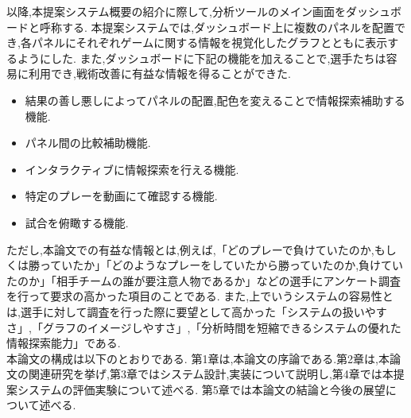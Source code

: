 \documentclass[sotsuron]{kuee}
\begin{document}
	以降,本提案システム概要の紹介に際して,分析ツールのメイン画面をダッシュボードと呼称する.
	本提案システムでは,ダッシュボード上に複数のパネルを配置でき,各パネルにそれぞれゲームに関する情報を視覚化したグラフとともに表示するようにした.
	また,ダッシュボードに下記の機能を加えることで,選手たちは容易に利用でき,戦術改善に有益な情報を得ることができた.
		\begin{itemize}
			\item 結果の善し悪しによってパネルの配置,配色を変えることで情報探索補助する機能.
			\item パネル間の比較補助機能.
			\item インタラクティブに情報探索を行える機能.
			\item 特定のプレーを動画にて確認する機能.
			\item 試合を俯瞰する機能.
		\end{itemize}
	ただし,本論文での有益な情報とは,例えば,「どのプレーで負けていたのか,もしくは勝っていたか」「どのようなプレーをしていたから勝っていたのか,負けていたのか」「相手チームの誰が要注意人物であるか」などの選手にアンケート調査を行って要求の高かった項目のことである.
	また,上でいうシステムの容易性とは,選手に対して調査を行った際に要望として高かった「システムの扱いやすさ」,「グラフのイメージしやすさ」,「分析時間を短縮できるシステムの優れた情報探索能力」である.
	\\本論文の構成は以下のとおりである.
	第1章は,本論文の序論である.第2章は,本論文の関連研究を挙げ,第3章ではシステム設計,実装について説明し,第4章では本提案システムの評価実験について述べる.
	第5章では本論文の結論と今後の展望について述べる.

\end{document}
